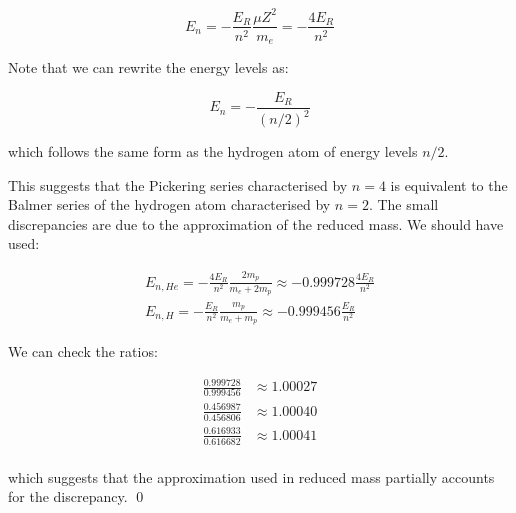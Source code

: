 \documentclass[12pt]{article}
\begin{document}
\begin{equation}
    E_{n} = -\frac{E_{R}}{n^{2}} \frac{\mu Z^{2}}{m_{e}} = -\frac{4E_{R}}{n^{2}}
\end{equation}

Note that we can rewrite the energy levels as:

\begin{equation}
    E_{n} = -\frac{E_{R}}{(n/2)^{2}}
\end{equation}

which follows the same form as the hydrogen atom of energy levels $n/2$.

This suggests that the Pickering series characterised by $n = 4$ is equivalent to the Balmer series of the hydrogen atom characterised by $n = 2$. The small discrepancies are due to the approximation of the reduced mass. We should have used:

\begin{equation}
    \begin{split}
        E_{n, He} = -\frac{4E_{R}}{n^{2}} \frac{2m_{p}}{m_{e} + 2m_{p}} \approx -0.999728 \frac{4E_{R}}{n^{2}} \\
        E_{n, H} = -\frac{E_{R}}{n^{2}} \frac{m_{p}}{m_{e} + m_{p}} \approx -0.999456 \frac{E_{R}}{n^{2}}
    \end{split}
\end{equation}

We can check the ratios:

\begin{equation}
    \begin{split}
        \frac{0.999728}{0.999456} &\approx 1.00027 \\
        \frac{0.456987}{0.456806} &\approx 1.00040 \\
        \frac{0.616933}{0.616682} &\approx 1.00041 \\
    \end{split}
\end{equation}

which suggests that the approximation used in reduced mass partially accounts for the discrepancy.
\qed
\end{document}

